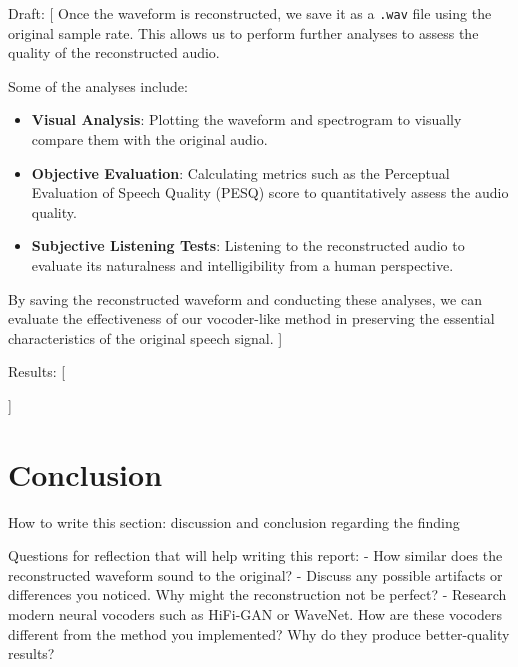 \documentclass[12pt]{article}
\begin{document}
Draft: [
Once the waveform is reconstructed, we save it as a \texttt{.wav} file using the original sample rate. This allows us to perform further analyses to assess the quality of the reconstructed audio.

Some of the analyses include:

\begin{itemize}
    \item \textbf{Visual Analysis}: Plotting the waveform and spectrogram to visually compare them with the original audio.
    \item \textbf{Objective Evaluation}: Calculating metrics such as the Perceptual Evaluation of Speech Quality (PESQ) score to quantitatively assess the audio quality.
    \item \textbf{Subjective Listening Tests}: Listening to the reconstructed audio to evaluate its naturalness and intelligibility from a human perspective.
\end{itemize}

By saving the reconstructed waveform and conducting these analyses, we can evaluate the effectiveness of our vocoder-like method in preserving the essential characteristics of the original speech signal.
]

Results: [

]


\section{Conclusion}
How to write this section: discussion and conclusion regarding the finding

Questions for reflection that will help writing this report:
- How similar does the reconstructed waveform sound to the original?
- Discuss any possible artifacts or differences you noticed. Why might the reconstruction not be perfect?
- Research modern neural vocoders such as HiFi-GAN or WaveNet. How are these vocoders different from the method you implemented? Why do they produce better-quality results?


\newpage


\end{document}
